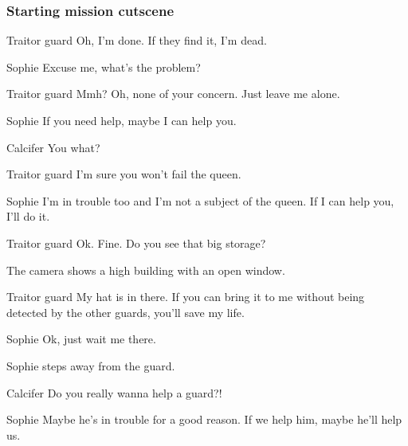 \subsubsection*{Starting mission cutscene}
\begin{screenplay}

\begin{dialogue}[forlorn]{Traitor guard}
Oh, I'm done. If they find it, I'm dead.
\end{dialogue}

\begin{dialogue}{Sophie}
Excuse me, what's the problem?
\end{dialogue}

\begin{dialogue}[forlorn]{Traitor guard}
Mmh? Oh, none of your concern. Just leave me alone.
\end{dialogue}

\begin{dialogue}{Sophie}
If you need help, maybe I can help you.
\end{dialogue}

\begin{dialogue}[surprised]{Calcifer}
You what?
\end{dialogue}

\begin{dialogue}[forlorn]{Traitor guard}
I'm sure you won't fail the queen.
\end{dialogue}

\begin{dialogue}{Sophie}
I'm in trouble too and I'm not a subject of the queen. If I can help you, I'll do it.
\end{dialogue}

\begin{dialogue}[weird]{Traitor guard}
Ok. Fine. Do you see that big storage?
\end{dialogue}

The camera shows a high building with an open window.

\begin{dialogue}[continuing]{Traitor guard}
My hat is in there. If you can bring it to me without being detected by the other guards, you'll save my life.
\end{dialogue}

\begin{dialogue}{Sophie}
Ok, just wait me there.
\end{dialogue}

Sophie steps away from the guard.

\begin{dialogue}[disappointed]{Calcifer}
Do you really wanna help a guard?!
\end{dialogue}

\begin{dialogue}{Sophie}
Maybe he's in trouble for a good reason. If we help him, maybe he'll help us.
\end{dialogue}

\end{screenplay}

